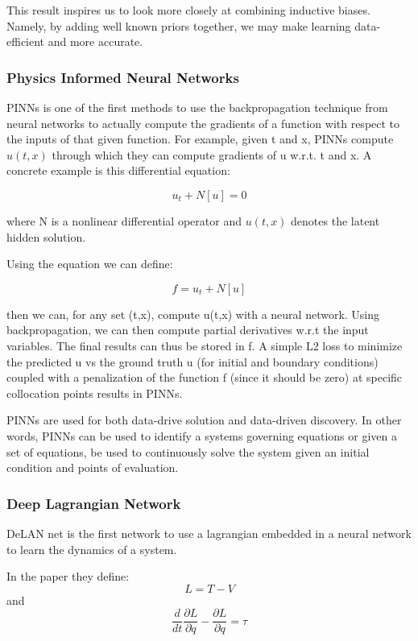 \documentclass{article}
\begin{document}
This result inspires us to look more closely at combining inductive biases. Namely, by adding well known priors together, we may make learning data-efficient and more accurate.

\subsubsection{Physics Informed Neural Networks}

PINNs is one of the first methods to use the backpropagation technique from neural networks to actually compute the gradients of a function with respect to the inputs of that given function. For example, given t and x, PINNs compute $u(t,x)$ through which they can compute gradients of u w.r.t. t and x. A concrete example is this differential equation:


$$ u_t + N[u] = 0$$

where N is a nonlinear differential operator and $u(t,x)$ denotes the latent hidden solution.

Using the equation we can define:

$$ f = u_t +N[u] $$

then we can, for any set (t,x), compute u(t,x) with a neural network. Using backpropagation, we can then compute partial derivatives w.r.t the input variables. The final results can thus be stored in f. A simple L2 loss to minimize the predicted u vs the ground truth u (for initial and boundary conditions) coupled with a penalization of the function f (since it should be zero) at specific collocation points results in PINNs.

PINNs are used for both data-drive solution and data-driven discovery. In other words, PINNs can be used to identify a systems governing equations or given a set of equations, be used to continuously solve the system given an initial condition and points of evaluation.





\subsubsection{Deep Lagrangian Network}

DeLAN net is the first network to use a lagrangian embedded in a neural network to learn the dynamics of a system. 

In the paper they define:
$$ L = T - V$$
and
$$ \frac{d}{dt}\frac{\partial L}{\partial \dot{q}} - \frac{\partial L}{\partial q} = \tau $$
\end{document}
